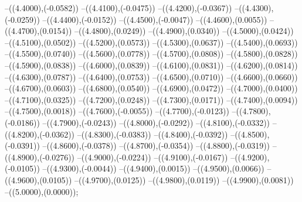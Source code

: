{	--({\sx*(4.4000)},{\sy*(-0.0582)})
	--({\sx*(4.4100)},{\sy*(-0.0475)})
	--({\sx*(4.4200)},{\sy*(-0.0367)})
	--({\sx*(4.4300)},{\sy*(-0.0259)})
	--({\sx*(4.4400)},{\sy*(-0.0152)})
	--({\sx*(4.4500)},{\sy*(-0.0047)})
	--({\sx*(4.4600)},{\sy*(0.0055)})
	--({\sx*(4.4700)},{\sy*(0.0154)})
	--({\sx*(4.4800)},{\sy*(0.0249)})
	--({\sx*(4.4900)},{\sy*(0.0340)})
	--({\sx*(4.5000)},{\sy*(0.0424)})
	--({\sx*(4.5100)},{\sy*(0.0502)})
	--({\sx*(4.5200)},{\sy*(0.0573)})
	--({\sx*(4.5300)},{\sy*(0.0637)})
	--({\sx*(4.5400)},{\sy*(0.0693)})
	--({\sx*(4.5500)},{\sy*(0.0740)})
	--({\sx*(4.5600)},{\sy*(0.0778)})
	--({\sx*(4.5700)},{\sy*(0.0808)})
	--({\sx*(4.5800)},{\sy*(0.0828)})
	--({\sx*(4.5900)},{\sy*(0.0838)})
	--({\sx*(4.6000)},{\sy*(0.0839)})
	--({\sx*(4.6100)},{\sy*(0.0831)})
	--({\sx*(4.6200)},{\sy*(0.0814)})
	--({\sx*(4.6300)},{\sy*(0.0787)})
	--({\sx*(4.6400)},{\sy*(0.0753)})
	--({\sx*(4.6500)},{\sy*(0.0710)})
	--({\sx*(4.6600)},{\sy*(0.0660)})
	--({\sx*(4.6700)},{\sy*(0.0603)})
	--({\sx*(4.6800)},{\sy*(0.0540)})
	--({\sx*(4.6900)},{\sy*(0.0472)})
	--({\sx*(4.7000)},{\sy*(0.0400)})
	--({\sx*(4.7100)},{\sy*(0.0325)})
	--({\sx*(4.7200)},{\sy*(0.0248)})
	--({\sx*(4.7300)},{\sy*(0.0171)})
	--({\sx*(4.7400)},{\sy*(0.0094)})
	--({\sx*(4.7500)},{\sy*(0.0018)})
	--({\sx*(4.7600)},{\sy*(-0.0055)})
	--({\sx*(4.7700)},{\sy*(-0.0123)})
	--({\sx*(4.7800)},{\sy*(-0.0186)})
	--({\sx*(4.7900)},{\sy*(-0.0243)})
	--({\sx*(4.8000)},{\sy*(-0.0292)})
	--({\sx*(4.8100)},{\sy*(-0.0332)})
	--({\sx*(4.8200)},{\sy*(-0.0362)})
	--({\sx*(4.8300)},{\sy*(-0.0383)})
	--({\sx*(4.8400)},{\sy*(-0.0392)})
	--({\sx*(4.8500)},{\sy*(-0.0391)})
	--({\sx*(4.8600)},{\sy*(-0.0378)})
	--({\sx*(4.8700)},{\sy*(-0.0354)})
	--({\sx*(4.8800)},{\sy*(-0.0319)})
	--({\sx*(4.8900)},{\sy*(-0.0276)})
	--({\sx*(4.9000)},{\sy*(-0.0224)})
	--({\sx*(4.9100)},{\sy*(-0.0167)})
	--({\sx*(4.9200)},{\sy*(-0.0105)})
	--({\sx*(4.9300)},{\sy*(-0.0044)})
	--({\sx*(4.9400)},{\sy*(0.0015)})
	--({\sx*(4.9500)},{\sy*(0.0066)})
	--({\sx*(4.9600)},{\sy*(0.0105)})
	--({\sx*(4.9700)},{\sy*(0.0125)})
	--({\sx*(4.9800)},{\sy*(0.0119)})
	--({\sx*(4.9900)},{\sy*(0.0081)})
	--({\sx*(5.0000)},{\sy*(0.0000)});
}
